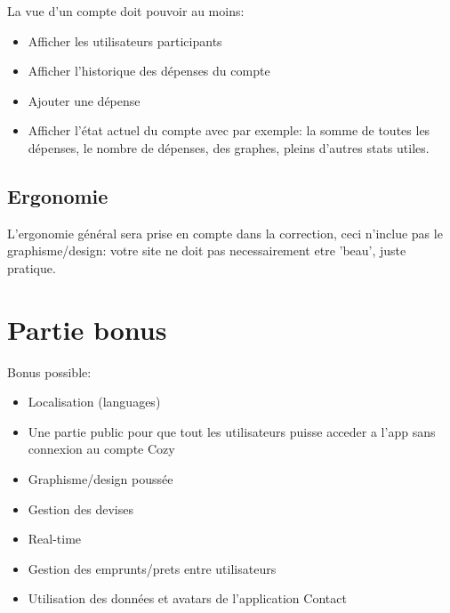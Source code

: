 \documentclass{42-fr}
\begin{document}
        La vue d'un compte doit pouvoir au moins:\\

        \begin{itemize}\itemsep1pt
            \item Afficher les utilisateurs participants
            \item Afficher l'historique des d\'epenses du compte
			\item Ajouter une d\'epense
			\item Afficher l'\'etat actuel du compte avec par exemple: la somme
				de toutes les d\'epenses, le nombre de d\'epenses, des graphes,
				pleins d'autres stats utiles.
        \end{itemize}


    \section{Ergonomie}

        L'ergonomie g\'en\'eral sera prise en compte dans la correction,
		ceci n'inclue pas le graphisme/design: votre site ne doit pas necessairement
		etre 'beau', juste pratique.


\chapter{Partie bonus}

    Bonus possible:\newline

    \begin{itemize}\itemsep1pt
		\item Localisation (languages)
        \item Une partie public pour que tout les utilisateurs puisse acceder a
			l'app sans connexion au compte Cozy
        \item Graphisme/design pouss\'ee
        \item Gestion des devises
		\item Real-time
		\item Gestion des emprunts/prets entre utilisateurs
		\item Utilisation des donn\'ees et avatars de l'application Contact
    \end{itemize}
\end{document}
